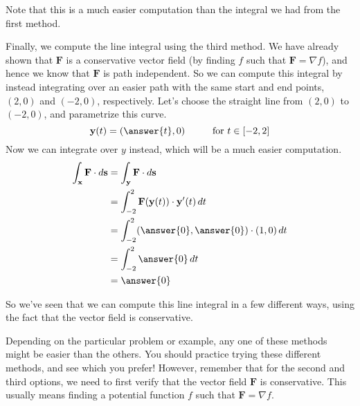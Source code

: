 \documentclass{ximera}
\begin{document}
\begin{example}
\begin{explanation}
Note that this is a much easier computation than the integral we had from the first method.

Finally, we compute the line integral using the third method. We have already shown that $\mathbf{F}$ is a conservative vector field (by finding $f$ such that $\mathbf{F}=\nabla f$), and hence we know that $\mathbf{F}$ is path independent. So we can compute this integral by instead integrating over an easier path with the same start and end points, $(2,0)$ and $(-2,0)$, respectively. Let's choose the straight line from $(2,0)$ to $(-2,0)$, and parametrize this curve.
\[
\textbf{y}(t)=(\answer{t}, 0)\hspace{1cm} \textrm{for }t\in[-2,2]
\]
Now we can integrate over $y$ instead, which will be a much easier computation.
\begin{align*}
\int_{\textbf{x}}\textbf{F}\cdot d\textbf{s}  &= \int_{\textbf{y}}\textbf{F}\cdot d\textbf{s}\\
&= \int_{-2}^{2} \textbf{F}(\textbf{y}(t))\cdot \textbf{y}'(t)\,dt\\
&= \int_{-2}^{2} (\answer{0},\answer{0})\cdot (1,0)\,dt\\
&= \int_{-2}^{2} \answer{0}\,dt\\
&= \answer{0}
\end{align*}

So we've seen that we can compute this line integral in a few different ways, using the fact that the vector field is conservative.
\end{explanation}
\end{example}

Depending on the particular problem or example, any one of these methods might be easier than the others. You should practice trying these different methods, and see which you prefer! However, remember that for the second and third options, we need to first verify that the vector field $\mathbf{F}$ is conservative. This usually means finding a potential function $f$ such that $\mathbf{F}=\nabla f$.
\end{document}
